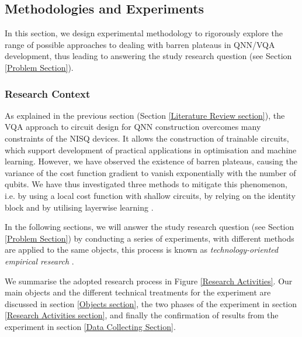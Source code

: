 \subsection{Methodologies and Experiments}
In this section, we design experimental methodology to rigorously explore the range of possible approaches to dealing with barren plateaus in QNN/VQA development, thus leading to answering the study research question (see Section \ref{Problem Section}).

\subsubsection{Research Context}

As explained in the previous section (Section \ref{Literature Review section}), the VQA approach to circuit design for QNN construction overcomes many constraints of the NISQ devices. It allows the construction of trainable circuits, which support development of practical applications in optimisation and machine learning.
However, we have observed the existence of barren plateaus, causing the variance of the cost function gradient to vanish exponentially with the number of qubits.
We have thus investigated three methods to mitigate this phenomenon, i.e. by using a local cost function with shallow circuits, by relying on the identity block and by utilising layerwise learning \cite{cerezoCostFunctionDependent2021, liuParameterInitializationMethod2021, skolikLayerwiseLearningQuantum2021}.

In the following sections, we will answer the study research question (see Section \ref{Problem Section}) by conducting a series of experiments, with different methods are applied to the same objects, this process is known as \emph{technology-oriented empirical research} \cite{wohlinExperimentationSoftwareEngineering2012}.

We summarise the adopted research process in Figure \ref{Research Activities}.
Our main objects and the different technical treatments for the experiment are discussed in section \ref{Objects section}, the two phases of the experiment in section \ref{Research Activities section}, and finally the confirmation of results from the experiment in section \ref{Data Collecting Section}.

